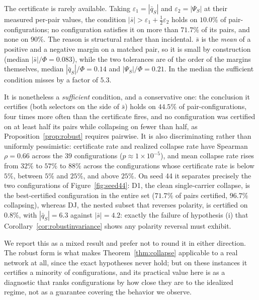 \documentclass[11pt,a4paper]{article}
\begin{document}
The certificate is rarely available. Taking $\varepsilon_1=|\bar q_S|$ and
$\varepsilon_2=|\Psi_S|$ at their measured per-pair values, the condition
$|\bar s|>\varepsilon_1+\tfrac12\varepsilon_2$ holds on $10.0\%$ of
pair-configurations; no configuration satisfies it on more than $71.7\%$ of its
pairs, and none on $90\%$. The reason is structural rather than incidental.
$\bar s$ is the \emph{mean} of a positive and a negative margin on a matched
pair, so it is small by construction (median $|\bar s|/\Phi=0.083$), while
the two tolerances are of the order of the margins themselves, median
$|\bar q_S|/\Phi=0.14$ and $|\Psi_S|/\Phi=0.21$. In the median the sufficient
condition misses by a factor of $5.3$.

It is nonetheless a \emph{sufficient} condition, and a conservative one: the
conclusion it certifies (both selectors on the side of $\bar s$) holds on
$44.5\%$ of pair-configurations, four times more often than the certificate
fires, and no configuration was certified on at least half its pairs while
collapsing on fewer than half, as Proposition~\ref{prop:robust} requires
pairwise. It is also discriminating rather than uniformly pessimistic:
certificate rate and realized collapse rate have Spearman $\rho=0.66$ across
the $39$ configurations ($p\approx1\times10^{-5}$), and mean collapse rate
rises from $32\%$ to $57\%$ to $88\%$ across the configurations whose
certificate rate is below $5\%$, between $5\%$ and $25\%$, and above $25\%$.
On seed 44 it separates precisely the two configurations of
Figure~\ref{fig:seed44}: D1, the clean single-carrier collapse, is the
best-certified configuration in the entire set ($71.7\%$ of pairs certified,
$96.7\%$ collapsing), whereas DJ, the nested subset that reverses polarity, is
certified on $0.8\%$, with $|\bar q_S|=6.3$ against $|\bar s|=4.2$: exactly
the failure of hypothesis (i) that Corollary~\ref{cor:robustinvariance} shows
any polarity reversal must exhibit.

We report this as a mixed result and prefer not to round it in either
direction. The robust form is what makes Theorem~\ref{thm:collapse} applicable
to a real network at all, since the exact hypotheses never hold; but on these
instances it certifies a minority of configurations, and its practical value
here is as a diagnostic that ranks configurations by how close they are to the
idealized regime, not as a guarantee covering the behavior we observe.
\end{document}
